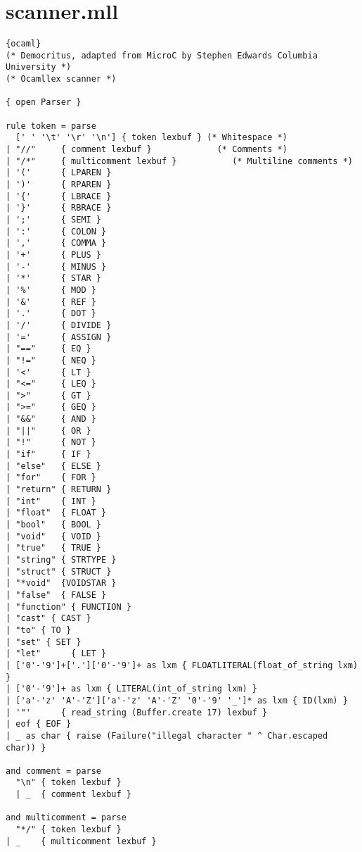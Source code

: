 \section{scanner.mll}
\begin{lstlisting}{ocaml}
(* Democritus, adapted from MicroC by Stephen Edwards Columbia University *)
(* Ocamllex scanner *)

{ open Parser }

rule token = parse
  [' ' '\t' '\r' '\n'] { token lexbuf } (* Whitespace *)
| "//"     { comment lexbuf }             (* Comments *)
| "/*"     { multicomment lexbuf }           (* Multiline comments *)
| '('      { LPAREN }
| ')'      { RPAREN }
| '{'      { LBRACE }
| '}'      { RBRACE }
| ';'      { SEMI }
| ':'      { COLON }
| ','      { COMMA }
| '+'      { PLUS }
| '-'      { MINUS }
| '*'      { STAR }
| '%'	   { MOD }
| '&'	   { REF }
| '.'      { DOT }
| '/'      { DIVIDE }
| '='      { ASSIGN }
| "=="     { EQ }
| "!="     { NEQ }
| '<'      { LT }
| "<="     { LEQ }
| ">"      { GT }
| ">="     { GEQ }
| "&&"     { AND }
| "||"     { OR }
| "!"      { NOT }
| "if"     { IF }
| "else"   { ELSE }
| "for"    { FOR }
| "return" { RETURN }
| "int"    { INT }
| "float"  { FLOAT }
| "bool"   { BOOL }
| "void"   { VOID }
| "true"   { TRUE }
| "string" { STRTYPE }
| "struct" { STRUCT }
| "*void"  {VOIDSTAR }
| "false"  { FALSE }
| "function" { FUNCTION }
| "cast" { CAST }
| "to" { TO }
| "set" { SET }
| "let"      { LET }
| ['0'-'9']+['.']['0'-'9']+ as lxm { FLOATLITERAL(float_of_string lxm) }
| ['0'-'9']+ as lxm { LITERAL(int_of_string lxm) }
| ['a'-'z' 'A'-'Z']['a'-'z' 'A'-'Z' '0'-'9' '_']* as lxm { ID(lxm) }
| '"'      { read_string (Buffer.create 17) lexbuf }
| eof { EOF }
| _ as char { raise (Failure("illegal character " ^ Char.escaped char)) }

and comment = parse
  "\n" { token lexbuf }
  | _  { comment lexbuf }

and multicomment = parse
  "*/" { token lexbuf }
| _    { multicomment lexbuf }


\end{lstlisting}
